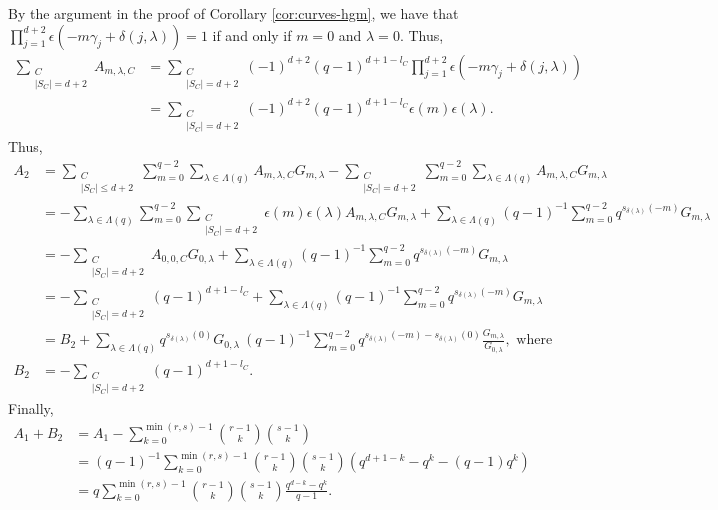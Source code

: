 \documentclass[11pt, reqno]{amsart}
\theoremstyle{plain}
\theoremstyle{definition}
\begin{document}
By the argument in the proof of Corollary \ref{cor:curves-hgm}, we have that 
$\prod_{j=1}^{d+2} \epsilon \left( -m \gamma_j +\delta(j,\lambda)\right) =1$ if and only if $ m=0$ and $\lambda=0$. Thus,
\begin{align*}
  \sum_{ \substack{C \\ |S_C| =d+2}} A_{m,\lambda,C}&=    \sum_{ \substack{C \\ |S_C| =d+2}} (-1)^{d+2}(q-1)^{d+1-l_C}
  \prod_{j=1}^{d+2} \epsilon \left( -m \gamma_j +\delta(j,\lambda)\right) \\
  &=   \sum_{ \substack{C \\ |S_C| = d+2}} (-1)^{d+2}(q-1)^{d+1-l_C}  \epsilon(m)\epsilon(\lambda) . \label{eq:d+2}
\end{align*}
Thus,
\begin{align*}
    A_2 &=  \sum_{ \substack{C \\ |S_C| \le d+2}}\sum_{m=0}^{q-2} \sum_{\lambda \in \Lambda(q)} A_{m,\lambda,C} G_{m,\lambda} -\sum_{ \substack{C \\ |S_C| = d+2}}\sum_{m=0}^{q-2} \sum_{\lambda \in \Lambda(q)} A_{m,\lambda,C} G_{m,\lambda} \\
    &= - \sum_{\lambda \in \Lambda(q)} \sum_{m=0}^{q-2} \sum_{ \substack{C \\ |S_C| = d+2}}  \epsilon(m)\epsilon(\lambda)  A_{m,\lambda,C}    G_{m,\lambda} + \sum_{\lambda \in \Lambda(q)}(q-1)^{-1} \sum_{m=0}^{q-2}  q^{s_{\delta(\lambda)} (-m)}G_{m,\lambda} \\
     &= -   \sum_{ \substack{C \\ |S_C| = d+2}}  A_{0,0,C}   G_{0,\lambda}  +\sum_{\lambda \in \Lambda(q)}(q-1)^{-1}\sum_{m=0}^{q-2}  q^{s_{\delta(\lambda)} (-m)}G_{m,\lambda} \\
    &= - \sum_{ \substack{C \\ |S_C| = d+2}} (q-1)^{d+1-l_C} + \sum_{\lambda \in \Lambda(q)} (q-1)^{-1}\sum_{m=0}^{q-2}  q^{s_{\delta(\lambda)} (-m)}G_{m,\lambda} \\
    &= B_2 + \sum_{\lambda \in \Lambda(q)} q^{s_{\delta(\lambda)} (0)}G_{0,\lambda} \ (q-1)^{-1} \sum_{m=0}^{q-2}  q^{s_{\delta(\lambda)} (-m) -s_{\delta(\lambda)} (0)}\frac{G_{m,\lambda}}{G_{0,\lambda}}, \text{ where }\\
    B_2 &= - \sum_{ \substack{C \\ |S_C| = d+2}} (q-1)^{d+1-l_C}.
\end{align*}
Finally,
\begin{align*}
   A_1+ B_2 &= A_1- \sum_{k=0}^{\min(r,s)-1}  {\binom{r-1}{k}}{\binom{s-1}{k}} \\
    &=(q-1)^{-1} \sum_{k=0}^{\min{(r,s)-1}} {\binom{r-1}{k}}{\binom{s-1}{k}} \left( q^{d+1-k} - q^{k} -(q-1) q^k \right) \\
    &=q \sum_{k=0}^{\min{(r,s)-1}} {\binom{r-1}{k}}{\binom{s-1}{k}} \frac{q^{d-k} - q^{k} }{q-1}.
\end{align*}
\end{document}
